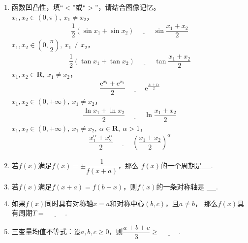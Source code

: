 \documentclass{article}
\newif\ifte
\newcommand{\e}{\mathrm{e}}
\renewcommand\geq\geqslant
\begin{document}
\begin{multicols}{2}
\begin{enumerate}[leftmargin=20pt]
\item 函数凹凸性，填“$ < $”或“$ > $”，请结合图像记忆。\\
$ x_1,x_2\in (0,\pi),\ x_1\neq x_2 $，
\begin{align*}
    \dfrac{1}{2} \left(\sin x_1 + \sin x_2 \right) 
    \underline{\ \ifte < \else \hspace{1cm} \fi\ }
    \sin \dfrac{x_1+x_2}{2}
\end{align*}
$ x_1,x_2\in (0,\dfrac{\pi}{2}),\ x_1\neq x_2 $，
\begin{align*}
    \dfrac{1}{2}\left(\tan x_1+\tan x_2\right)
    \underline{\ \ifte > \else \hspace{1cm} \fi\ }
    \tan\dfrac{x_1+x_2}{2}
\end{align*}
$ x_1,x_2\in \textbf{R},\ x_1\neq x_2 $，
\begin{align*}
    \dfrac{\e^{x_1}+\e^{x_2}}{2}
    \underline{\ \ifte > \else \hspace{1cm} \fi\ }
    \e^{\frac{x_1+x_2}{2}}
\end{align*}
$ x_1,x_2\in (0,+\infty),\ x_1\neq x_2 $，
\begin{align*}
    \dfrac{\ln x_1+\ln x_2}{2}
    \underline{\ \ifte < \else \hspace{1cm} \fi\ }
    \ln\dfrac{x_1+x_2}{2}
\end{align*}
$ x_1,x_2\in (0,+\infty),\ x_1\neq x_2,
\ \alpha\in \textbf{R},\ \alpha>1 $，
\begin{gather*}
    \dfrac{x_1^{\alpha}+x_2^{\alpha}}{2}
    \underline{\ \ifte > \else \hspace{1cm} \fi\ }
    \left( \dfrac{x_1+x_2}{2}\right)^{\alpha}
\end{gather*}

\item 若$ f(x) $满足$ f(x)=\pm\dfrac{1}{f(x+a)} $，那么
$ f(x) $的一个周期是\underline{\ \ifte $ 2a $ \else \hspace{1cm} \fi\ }.

\item 若$ f(x) $满足$ f(x+a)=f(b-x) $，则$ f(x) $的一条对称轴是
\underline{\ \ifte $ x=\dfrac{a+b}{2} $ \else \hspace{2cm} \fi\ }.  

\item 如果$ f(x) $同时具有对称轴$ x=a $和对称中心$ (b,c) $，且$ a\neq b $，
那么$ f(x) $具有周期$ T=\underline{\ \ifte 4|a-b|\else \hspace{1cm} \fi\ } $.

\item 三变量均值不等式：设$ a,b,c\geq 0 $，则$ \dfrac{a+b+c}{3}\geq 
\underline{\ \ifte \sqrt[3]{abc}\else \hspace{1cm} \fi\ } $.


\end{enumerate}
\end{multicols}
\end{document}
